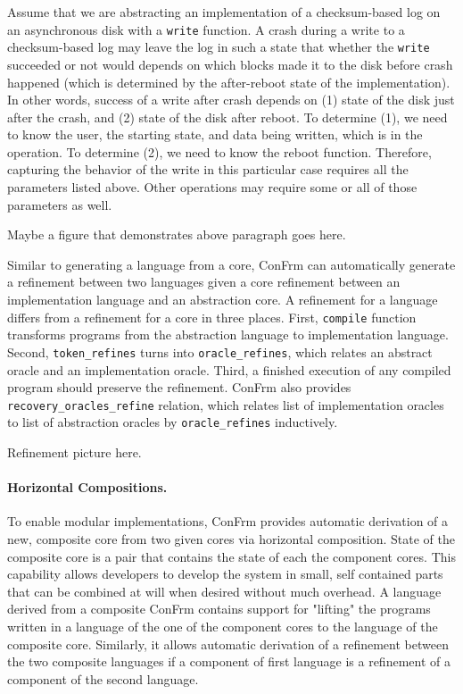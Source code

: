 Assume that we are abstracting an implementation of a checksum-based log on an asynchronous disk with a \texttt{write} function.
A crash during a write to a checksum-based log may leave the log in such a state that whether the \texttt{write} succeeded or not would depends on which blocks made it to the disk before crash happened (which is determined by the after-reboot state of the implementation). In other words, success of a write after crash depends on (1) state of the disk just after the crash, and (2) state of the disk after reboot. To determine (1), we need to know the user, the starting state, and data being written, which is in the operation. To determine (2), we need to know the reboot function. Therefore, capturing the behavior of the write in this particular case requires all the parameters listed above. Other operations may require some or all of those parameters as well.

{\color{red} Maybe a figure that demonstrates above paragraph goes here.}

Similar to generating a language from a core, ConFrm can automatically generate a refinement between two languages given a core refinement between an implementation language and an abstraction core. A refinement for a language differs from a refinement for a core in three places. First, \texttt{compile} function transforms programs from the abstraction language to implementation language. Second, \texttt{token\_refines} turns into \texttt{oracle\_refines}, which relates an abstract oracle and an implementation oracle.
Third, a finished execution of any compiled program should preserve the refinement. ConFrm also provides \texttt{recovery\_oracles\_refine} relation, which relates list of implementation oracles to list of abstraction oracles by \texttt{oracle\_refines} inductively.

{\color{red} Refinement picture here.}

\paragraph{Horizontal Compositions.}
To enable modular implementations, ConFrm provides automatic derivation of a new, composite core from two given cores via horizontal composition. State of the composite core is a pair that contains the state of each the component cores. This capability allows developers to develop the system in small, self contained parts that can be combined at will when desired without much overhead. A language derived from a composite ConFrm contains support for "lifting" the programs written in a language of the one of the component cores to the language of the composite core. Similarly, it allows automatic derivation of a refinement between the two composite languages if a component of first language is a refinement of a component of the second language.


